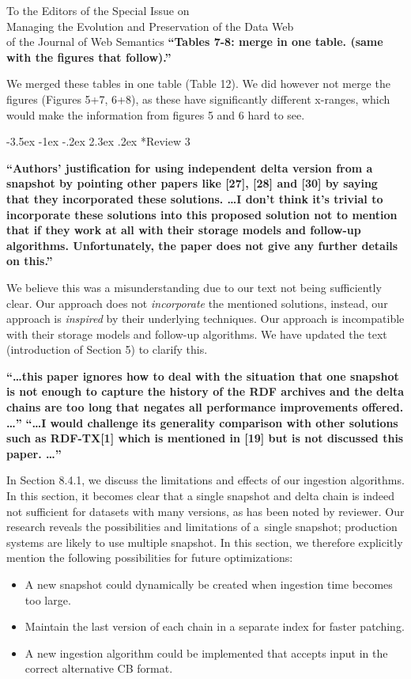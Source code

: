 \documentclass{letter}
\makeatletter
\newcounter{section}
\newcommand\section{\@startsection {section}{1}{\z@}%
                                   {-3.5ex \@plus -1ex \@minus -.2ex}%
                                   {2.3ex \@plus.2ex}%
                                   {\normalfont\Large\bfseries}}
\makeatother
\begin{document}
\begin{letter}{To the Editors of the Special Issue on\\Managing the Evolution and Preservation of the Data Web\\of the Journal of Web Semantics}
\textbf{\enquote{Tables 7-8: merge in one table. (same with the figures that follow).}}

We merged these tables in one table (Table 12).
We did however not merge the figures (Figures 5+7, 6+8), as these have significantly different x-ranges,
which would make the information from figures 5 and 6 hard to see.

\pagebreak
\section*{Review 3}

\textbf{\enquote{Authors' justification for using independent delta version from a snapshot by pointing other papers like [27], [28] and [30] by saying that they incorporated these solutions. \ldots I don't think it's trivial to incorporate these solutions into this proposed solution not to mention that if they work at all with their storage models and follow-up algorithms. Unfortunately, the paper does not give any further details on this.}}

We believe this was a misunderstanding due to our text not being sufficiently clear.
Our approach does not \emph{incorporate} the mentioned solutions,
instead, our approach is \emph{inspired} by their underlying techniques.
Our approach is incompatible with their storage models and follow-up algorithms.
We have updated the text (introduction of Section 5) to clarify this.

\textbf{\enquote{\ldots this paper ignores how to deal with the situation that one snapshot is not enough to capture the history of the RDF archives and the delta chains are too long that negates all performance improvements offered. \ldots}}
\textbf{\enquote{\ldots I would challenge its generality comparison with other solutions such as RDF-TX[1] which is mentioned in [19] but is not discussed this paper. \ldots}}

In Section 8.4.1, we discuss the limitations and effects of our ingestion algorithms.
In this section, it becomes clear that a single snapshot and delta chain is indeed not sufficient for datasets with many versions,
as has been noted by reviewer.
Our research reveals the possibilities and limitations of a~single snapshot;
production systems are likely to use multiple snapshot.
In this section, we therefore explicitly mention the following possibilities for future optimizations:
\begin{itemize}
    \item A new snapshot could dynamically be created when ingestion time becomes too large.
    \item Maintain the last version of each chain in a separate index for faster patching.
    \item A new ingestion algorithm could be implemented that accepts input in the correct alternative CB format.
\end{itemize}


\end{letter}
\end{document}
